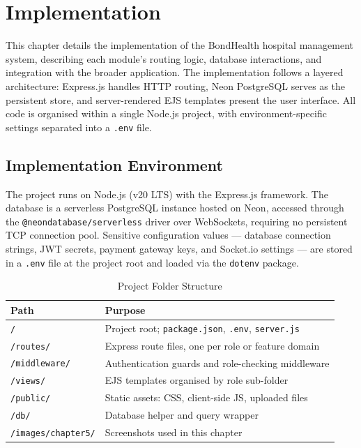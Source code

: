 \chapter{Implementation}
\label{ch:implementation}

\justifying
\noindent This chapter details the implementation of the BondHealth hospital management system, describing each module's routing logic, database interactions, and integration with the broader application. The implementation follows a layered architecture: Express.js handles HTTP routing, Neon PostgreSQL serves as the persistent store, and server-rendered EJS templates present the user interface. All code is organised within a single Node.js project, with environment-specific settings separated into a \texttt{.env} file.

\section{Implementation Environment}
\label{sec:impl-env}

\justifying
\noindent The project runs on Node.js (v20 LTS) with the Express.js framework. The database is a serverless PostgreSQL instance hosted on Neon, accessed through the \texttt{@neondatabase/serverless} driver over WebSockets, requiring no persistent TCP connection pool. Sensitive configuration values — database connection strings, JWT secrets, payment gateway keys, and Socket.io settings — are stored in a \texttt{.env} file at the project root and loaded via the \texttt{dotenv} package.

\vspace{1em}
\begin{table}[ht]
\centering
\begin{tabular}{ll}
\hline
\textbf{Path} & \textbf{Purpose} \\
\hline
\texttt{/} & Project root; \texttt{package.json}, \texttt{.env}, \texttt{server.js} \\
\texttt{/routes/} & Express route files, one per role or feature domain \\
\texttt{/middleware/} & Authentication guards and role-checking middleware \\
\texttt{/views/} & EJS templates organised by role sub-folder \\
\texttt{/public/} & Static assets: CSS, client-side JS, uploaded files \\
\texttt{/db/} & Database helper and query wrapper \\
\texttt{/images/chapter5/} & Screenshots used in this chapter \\
\hline
\end{tabular}
\caption{Project Folder Structure}
\label{tab:folder-structure}
\end{table}

